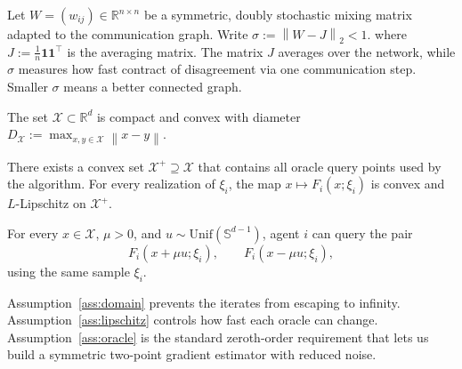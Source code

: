 \documentclass[runningheads]{llncs}
\newcommand{\R}{\mathbb{R}}
\newcommand{\norm}[1]{\left\lVert #1 \right\rVert}
\newcommand{\one}{\bm{1}}
\begin{document}
Let $W = (w_{ij}) \in \mathbb{R}^{n \times n}$ be a symmetric, doubly stochastic
mixing matrix adapted to the communication graph. Write
\(
\sigma := \norm{W-J}_2 < 1.
\)
where \(J := \frac{1}{n}\one\one^\top\) is the averaging matrix. The matrix
\(J\) averages over the network, while \(\sigma\) measures how fast contract 
of disagreement via one communication step. Smaller \(\sigma\) means a
better connected graph.

\begin{assumption}
\label{ass:domain}
The set $\mathcal{X} \subset \R^d$ is compact and convex with diameter
\(
D_{\mathcal{X}} := \max_{x,y \in \mathcal{X}} \norm{x-y}.
\)
\end{assumption}

\begin{assumption}
\label{ass:lipschitz}
There exists a convex set \(\mathcal{X}^+\supseteq \mathcal{X}\) that contains all oracle query
points used by the algorithm. For every realization of \(\xi_i\), the map
\(x \mapsto F_i(x;\xi_i)\) is convex and \(L\)-Lipschitz on \(\mathcal{X}^+\).
\end{assumption}

\begin{assumption}
\label{ass:oracle}
For every $x \in \mathcal{X}$, $\mu > 0$, and $u \sim \mathrm{Unif}(\mathbb{S}^{d-1})$, agent $i$ can query the pair
\[
F_i(x+\mu u;\xi_i),
\qquad
F_i(x-\mu u;\xi_i),
\]
using the same sample $\xi_i$.
\end{assumption}

Assumption~\ref{ass:domain} prevents the iterates from escaping to infinity. 
Assumption~\ref{ass:lipschitz} controls how fast each oracle can change. 
Assumption~\ref{ass:oracle} is the standard zeroth-order requirement that 
lets us build a symmetric two-point gradient estimator with reduced noise.
\end{document}

